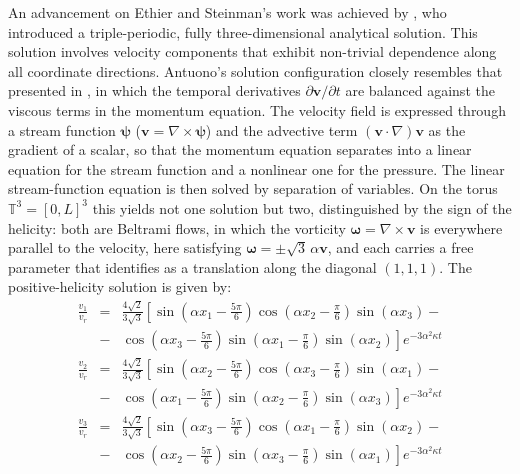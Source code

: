 \documentclass[11pt]{jfm}
\numberwithin{equation}{section}
\begin{document}
An advancement on Ethier and Steinman's work was achieved by  \cite{ant}, who introduced a triple-periodic, fully three-dimensional analytical solution. This solution involves velocity components that exhibit non-trivial dependence along all coordinate directions. Antuono's solution configuration closely resembles that presented in \cite{eth}, in which
the temporal derivatives $\partial \boldsymbol{v}/\partial t$ are balanced against
the viscous terms in the momentum equation. The velocity field is expressed through a stream
function $\boldsymbol{\psi}$ ($\boldsymbol{v}=\nabla\times\boldsymbol{\psi}$) and the advective term
$\left(\boldsymbol{v} \cdot \nabla\right)\boldsymbol{v}$ as the gradient of a scalar, so that the
momentum equation separates into a linear equation for the stream function and a nonlinear one
for the pressure. The linear stream-function equation is then solved by separation of variables.
On the torus $\mathbb{T}^3=\left[0,L\right]^3$ this yields not one solution but two, distinguished
by the sign of the helicity: both are Beltrami flows, in which the vorticity
$\boldsymbol{\omega}=\nabla\times\boldsymbol{v}$ is everywhere parallel to the velocity, here
satisfying $\boldsymbol{\omega}=\pm\sqrt3\,\alpha\boldsymbol{v}$, and each carries a free parameter that
\citet{ant} identifies as a translation along the diagonal $(1,1,1)$. The positive-helicity
solution is given by:
\begin{eqnarray}
\label{1.14}
\frac{v_1}{v_r}& = &\frac{4\sqrt{2}}{3\sqrt{3}}\left[\sin { \left(\alpha x_1-\frac{5\pi}{6} \right) } \cos {\left(\alpha x_2-\frac{\pi}{6}\right) }\sin { \left(\alpha x_3\right) }\right.- \nonumber\\
&-&\left.\cos  { \left(\alpha x_3-\frac{5\pi}{6} \right) }\sin  {\left( \alpha x_1-\frac{\pi}{6}\right) }  \sin  {\left( \alpha x_2\right) }\right]e^{ - 3\alpha ^2 \kappa t}
\end{eqnarray}
\begin{eqnarray}
\label{1.15}
\frac{v_2}{v_r}& = &\frac{4\sqrt{2}}{3\sqrt{3}}\left[\sin { \left(\alpha x_2-\frac{5\pi}{6} \right) } \cos {\left(\alpha x_3-\frac{\pi}{6}\right) }\sin { \left(\alpha x_1\right) }\right.- \nonumber\\
&-&\left. \cos  { \left(\alpha x_1-\frac{5\pi}{6} \right) }\sin  {\left( \alpha x_2-\frac{\pi}{6}\right) } \sin  {\left( \alpha x_3\right) }\right]e^{ - 3\alpha ^2 \kappa t}
\end{eqnarray}
\begin{eqnarray}
\label{1.16}
\frac{v_3}{v_r}& = &\frac{4\sqrt{2}}{3\sqrt{3}}\left[ \sin { \left(\alpha x_3-\frac{5\pi}{6} \right) } \cos {\left(\alpha x_1-\frac{\pi}{6}\right) }\sin { \left(\alpha x_2\right) }\right.- \nonumber\\
&-&\left. \cos  { \left(\alpha x_2-\frac{5\pi}{6} \right) }\sin  {\left( \alpha x_3-\frac{\pi}{6}\right) } \sin  {\left( \alpha x_1\right) }\right]e^{ - 3\alpha ^2 \kappa t}
\end{eqnarray}
\end{document}
